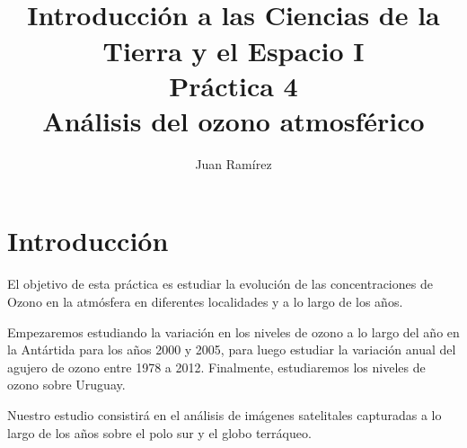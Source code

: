 \documentclass[a4paper]{article}
\title{\\[3cm]
\large Introducción a las Ciencias de la Tierra y el Espacio I\\[0.5cm]
Práctica 4\\[1cm]
\bf Análisis del ozono atmosférico}
\author{Juan Ramírez}
\begin{document}
\maketitle

\usetikzlibrary{calc} %

\bigskip

\tableofcontents

\newpage
\section*{Introducción}

El objetivo de esta práctica es estudiar la evolución de las concentraciones de Ozono en la atmósfera en diferentes localidades y a lo largo de los años.

Empezaremos estudiando la variación en los niveles de ozono a lo largo del año en la Antártida para los años 2000 y 2005, para luego estudiar la variación anual del agujero de ozono entre 1978 a 2012. Finalmente, estudiaremos los niveles de ozono sobre Uruguay.

Nuestro estudio consistirá en el análisis de imágenes satelitales capturadas a lo largo de los años sobre el polo sur y el globo terráqueo.
\end{document}
